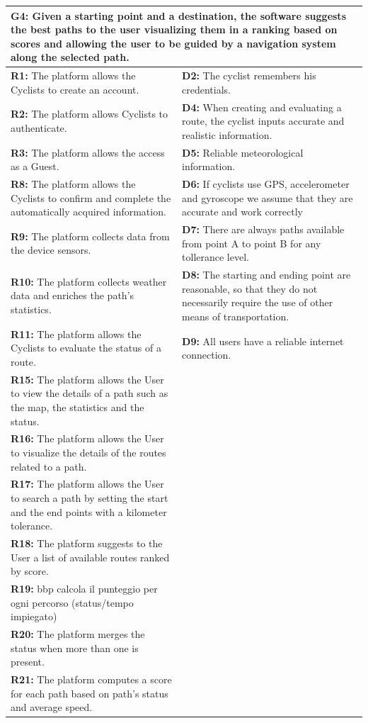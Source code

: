 \begin{table}[h!]
\centering
\begin{tabular}{|p{7cm}|p{7cm}|}
\hline
\multicolumn{2}{|p{14cm}|}{\textbf{G4:} Given a starting point and a destination, the software suggests the best paths to the user visualizing them in a ranking based on scores and allowing the user to be guided by a navigation system along the selected path.} \\ \hline
\textbf{R1:} The platform allows the Cyclists to create an account.& 
\textbf{D2:} The cyclist remembers his credentials. \\
\textbf{R2:} The platform allows Cyclists to authenticate.& 
\textbf{D4:} When creating and evaluating a route, the cyclist inputs accurate and realistic information.\\ 
\textbf{R3:} The platform allows the access as a Guest.& 
\textbf{D5:} Reliable meteorological information.\\ 
\textbf{R8:} The platform allows the Cyclists to confirm and complete the automatically acquired information.& 
\textbf{D6:} If cyclists use GPS, accelerometer and gyroscope we assume that they are accurate and work correctly\\ 
\textbf{R9:} The platform collects data from the device sensors.& 
\textbf{D7:} There are always paths available from point A to point B for any tollerance level.\\
\textbf{R10:} The platform collects weather data and enriches the path’s statistics.& 
\textbf{D8:} The starting and ending point are reasonable, so that they do not necessarily require the use of other
means of transportation.\\
\textbf{R11:} The platform allows the Cyclists to evaluate the status of a route. & 
\textbf{D9:} All users have a reliable internet connection. \\
\textbf{R15:} The platform allows the User to view the details of a path such as the map, the statistics and the status. &\\
\textbf{R16:} The platform allows the User to visualize the details of the routes related to a path.& \\
\textbf{R17:} The platform allows the User to search a path by setting the start and the end points with a kilometer tolerance.& \\
\textbf{R18:} The platform suggests to the User a list of available routes ranked by score. & \\
\textbf{R19:} bbp calcola il punteggio per ogni percorso (status/tempo impiegato) & \\
\textbf{R20:} The platform merges the status when more than one is present.& \\
\textbf{R21:} The platform computes a score for each path based on path's status and average speed.& \\
\hline
\end{tabular}
\end{table}
\clearpage
